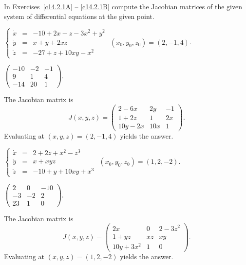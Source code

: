 \documentclass{ximera}
\begin{document}
\TEXER  

\noindent In Exercises~\ref{c14.2.1A} -- \ref{c14.2.1B} compute the Jacobian 
matrices of the given system of differential equations at the given point.
\begin{exercise} \label{c14.2.1A}
$\left\{\begin{array}{rcl} 
\dot{x} & = & -10 + 2x - z - 3x^2+y^2 \\
\dot{y} & = & x + y + 2xz \\
\dot{z} & = & -27 + z + 10xy - x^2  \end{array}\right.$ 
\AND $(x_0,y_0,z_0) = (2,-1,4)$.

\begin{solution}
\ans $\left(\begin{array}{rrr}
-10 & -2 & -1\\ 9 & 1 & 4 \\ -14 & 20 & 1\end{array}\right)$.

\vspace{0.08in}

\soln  The Jacobian matrix is
\[
J(x,y,z) = \left(\begin{array}{ccc}
2 - 6x & 2y & -1\\ 1+2z & 1 & 2x\\ 10y-2x & 10x & 1\end{array}\right).
\]
Evaluating at $(x,y,z)=(2,-1,4)$ yields the answer.

\end{solution}
\end{exercise}
\begin{exercise} \label{c14.2.1B}
$\left\{\begin{array}{rcl} 
\dot{x} & = & 2 + 2z + x^2 - z^3 \\
\dot{y} & = & x + xyz \\
\dot{z} & = & -10 + y + 10xy + x^3  \end{array}\right.$ 
\AND $(x_0,y_0,z_0) = (1,2,-2)$.

\begin{solution}
\ans $\left(\begin{array}{rrr}
2 & 0 & -10\\ -3 & -2 & 2 \\ 23 & 1 & 0 \end{array}\right)$.

\vspace{0.08in}

\soln  The Jacobian matrix is
\[
J(x,y,z) = \left(\begin{array}{ccc}
2x & 0 & 2-3z^2\\ 1+yz & xz & xy\\ 10y+3x^2 & 1 & 0 \end{array}\right).
\]
Evaluating at $(x,y,z)=(1,2,-2)$ yields the answer.


\end{solution}
\end{exercise}
\end{document}
